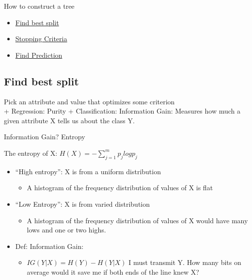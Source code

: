 \documentclass[
]{book}
\providecommand{\tightlist}{%
  \setlength{\itemsep}{0pt}\setlength{\parskip}{0pt}}
\begin{document}
How to construct a tree

\begin{itemize}
\tightlist
\item
  \protect\hyperlink{find-best-split}{Find best split}\\
\item
  \protect\hyperlink{stopping-criteria}{Stopping Criteria}\\
\item
  \protect\hyperlink{find-prediction}{Find Prediction}
\end{itemize}

\hypertarget{find-best-split}{%
\subsection{Find best split}\label{find-best-split}}

Pick an attribute and value that optimizes some criterion\\
+ Regression: Purity + Classification: Information Gain: Measures how much a given attribute X tells us about the class Y.

Information Gain? Entropy

The entropy of X: \(H(X) = -\sum_{j=1}^{m} p_j log p_j\)

\begin{itemize}
\item
  ``High entropy'': X is from a uniform distribution

  \begin{itemize}
  \tightlist
  \item
    A histogram of the frequency distribution of values of X is flat\\
  \end{itemize}
\item
  ``Low Entropy'': X is from varied distribution

  \begin{itemize}
  \tightlist
  \item
    A histogram of the frequency distribution of values of X would have many lows and one or two highs.\\
  \end{itemize}
\item
  Def: Information Gain:

  \begin{itemize}
  \tightlist
  \item
    \(IG(Y|X) = H(Y) - H(Y|X)\) I must transmit Y. How many bits on average would it save me if both ends of the line knew X?
  \end{itemize}
\end{itemize}
\end{document}

